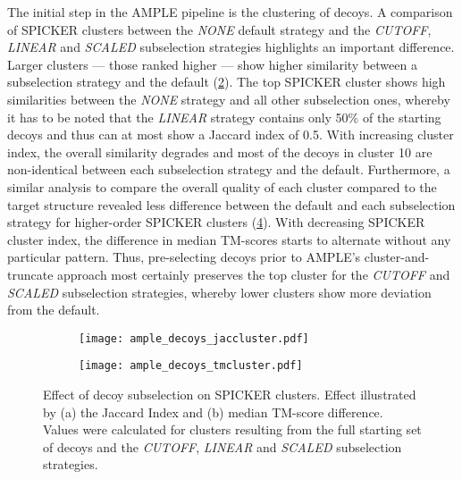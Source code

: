 The initial step in the AMPLE pipeline is the clustering of decoys. A comparison of SPICKER clusters between the \textit{NONE} default strategy and the \textit{CUTOFF}, \textit{LINEAR} and \textit{SCALED} subselection strategies highlights an important difference. Larger clusters --- those ranked higher --- show higher similarity between a subselection strategy and the default (\cref{fig:ample_decoys_jaccluster}). The top SPICKER cluster shows high similarities between the \textit{NONE} strategy and all other subselection ones, whereby it has to be noted that the \textit{LINEAR} strategy contains only 50\% of the starting decoys and thus can at most show a Jaccard index of 0.5. With increasing cluster index, the overall similarity degrades and most of the decoys in cluster 10 are non-identical between each subselection strategy and the default. Furthermore, a similar analysis to compare the overall quality of each cluster compared to the target structure revealed less difference between the default and each subselection strategy for higher-order SPICKER clusters (\cref{fig:ample_decoys_tmcluster}). With decreasing SPICKER cluster index, the difference in median TM-scores starts to alternate without any particular pattern. Thus, pre-selecting decoys prior to AMPLE's cluster-and-truncate approach most certainly preserves the top cluster for the \textit{CUTOFF} and \textit{SCALED} subselection strategies, whereby lower clusters show more deviation from the default.

\begin{figure}[H]
    \centering
    \begin{subfigure}[b]{\textwidth}
        \texttt{[image: ample\_decoys\_jaccluster.pdf]}
        \caption{}
        \label{fig:ample_decoys_jaccluster}
    \end{subfigure}
\end{figure}

\begin{figure}[H]\ContinuedFloat
    \begin{subfigure}[b]{\textwidth}
        \texttt{[image: ample\_decoys\_tmcluster.pdf]}
        \caption{}
        \label{fig:ample_decoys_tmcluster}
    \end{subfigure}
    \caption[Effect of decoy subselection on SPICKER clusters]{Effect of decoy subselection on SPICKER clusters. Effect illustrated by (a) the Jaccard Index and (b) median TM-score difference. Values were calculated for clusters resulting from the full starting set of decoys and the \textit{CUTOFF}, \textit{LINEAR} and \textit{SCALED} subselection strategies.}
\end{figure}

